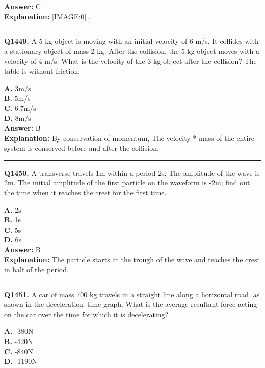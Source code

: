 \documentclass[12pt]{article}
\begin{document}
\textbf{Answer:} C \\
\textbf{Explanation:} [IMAGE:0]
.

\hrule
\vspace{1em}


\noindent
\textbf{Q1449.} A 5 kg object is moving with an initial velocity of 6 m/s. It collides with a stationary object of mass 2 kg. After the collision, the 5 kg object moves with a velocity of 4 m/s. What is the velocity of the 3 kg object after the collision? The table is without friction.



\textbf{A.} 3m/s \\
\textbf{B.} 5m/s \\
\textbf{C.} 6.7m/s \\
\textbf{D.} 8m/s \\

\textbf{Answer:} B \\
\textbf{Explanation:} By conservation of momentum, The velocity * mass of the entire system is conserved before and after the collision.

\hrule
\vspace{1em}


\noindent
\textbf{Q1450.} A transverse travels 1m within a period 2s. The amplitude of the wave is 2m. The initial amplitude of the first particle on the waveform is -2m; find out the time when it reaches the crest for the first time.



\textbf{A.} 2s \\
\textbf{B.} 1s \\
\textbf{C.} 5s \\
\textbf{D.} 6s \\

\textbf{Answer:} B \\
\textbf{Explanation:} The particle starts at the trough of the wave and reaches the crest in half of the period.

\hrule
\vspace{1em}


\noindent
\textbf{Q1451.} A car of mass 700 kg travels in a straight line along a horizontal road, as shown in the deceleration–time graph.
What is the average resultant force acting on the car over the time for which it is decelerating?



\textbf{A.} -380N \\
\textbf{B.} -420N \\
\textbf{C.} -840N \\
\textbf{D.} -1190N \\
\end{document}
